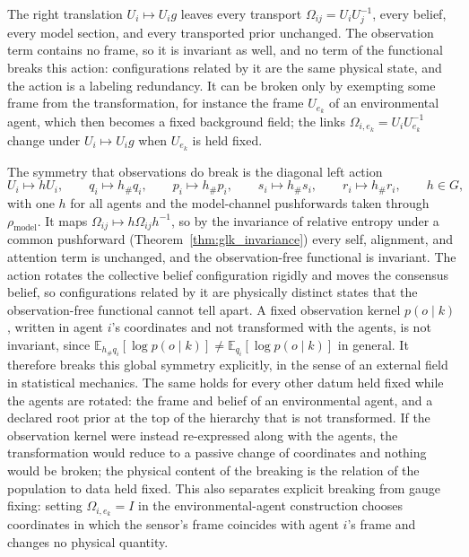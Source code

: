 The right translation $U_i\mapsto U_i g$ leaves every transport $\Omega_{ij}=U_iU_j^{-1}$, every belief, every model section, and every transported prior unchanged. The observation term contains no frame, so it is invariant as well, and no term of the functional breaks this action: configurations related by it are the same physical state, and the action is a labeling redundancy. It can be broken only by exempting some frame from the transformation, for instance the frame $U_{e_k}$ of an environmental agent, which then becomes a fixed background field; the links $\Omega_{i,e_k}=U_iU_{e_k}^{-1}$ change under $U_i\mapsto U_ig$ when $U_{e_k}$ is held fixed.

The symmetry that observations do break is the diagonal left action
\begin{equation}
U_i\mapsto hU_i,\qquad
q_i\mapsto h_\# q_i,\qquad
p_i\mapsto h_\# p_i,\qquad
s_i\mapsto h_\# s_i,\qquad
r_i\mapsto h_\# r_i,
\qquad h\in G,
\end{equation}
with one $h$ for all agents and the model-channel pushforwards taken through $\rho_{\mathrm{model}}$. It maps $\Omega_{ij}\mapsto h\Omega_{ij}h^{-1}$, so by the invariance of relative entropy under a common pushforward (Theorem~\ref{thm:glk_invariance}) every self, alignment, and attention term is unchanged, and the observation-free functional is invariant. The action rotates the collective belief configuration rigidly and moves the consensus belief, so configurations related by it are physically distinct states that the observation-free functional cannot tell apart. A fixed observation kernel $p(o\mid k)$, written in agent $i$'s coordinates and not transformed with the agents, is not invariant, since $\mathbb{E}_{h_\# q_i}[\log p(o\mid k)]\neq\mathbb{E}_{q_i}[\log p(o\mid k)]$ in general. It therefore breaks this global symmetry explicitly, in the sense of an external field in statistical mechanics. The same holds for every other datum held fixed while the agents are rotated: the frame and belief of an environmental agent, and a declared root prior at the top of the hierarchy that is not transformed. If the observation kernel were instead re-expressed along with the agents, the transformation would reduce to a passive change of coordinates and nothing would be broken; the physical content of the breaking is the relation of the population to data held fixed. This also separates explicit breaking from gauge fixing: setting $\Omega_{i,e_k}=I$ in the environmental-agent construction chooses coordinates in which the sensor's frame coincides with agent $i$'s frame and changes no physical quantity.

